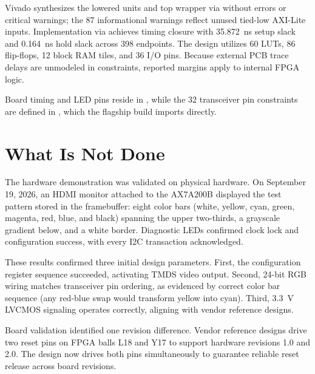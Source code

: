 \documentclass[journal,9pt]{IEEEtran}
\begin{document}


Vivado synthesizes the lowered units and top wrapper via
 without errors or critical warnings;
the 87 informational warnings reflect unused tied-low AXI-Lite inputs.
Implementation via  achieves timing
closure with 35.872~ns setup slack and 0.164~ns hold slack across 398
endpoints. The design utilizes 60 LUTs, 86 flip-flops, 12 block RAM tiles,
and 36 I/O pins. Because external PCB trace delays are unmodeled in
constraints, reported margins apply to internal FPGA logic.

Board timing and LED pins reside in ,
while the 32 transceiver pin constraints are defined in
, which the flagship build imports directly.





\section{What Is Not Done}
\label{sec:h-not}

The hardware demonstration was validated on physical hardware. On September
19, 2026, an HDMI monitor attached to the AX7A200B displayed the test
pattern stored in the framebuffer: eight color bars (white, yellow, cyan,
green, magenta, red, blue, and black) spanning the upper two-thirds, a
grayscale gradient below, and a white border. Diagnostic LEDs confirmed
clock lock and configuration success, with every I2C transaction
acknowledged.

These results confirmed three initial design parameters. First, the
configuration register sequence succeeded, activating TMDS video output.
Second, 24-bit RGB wiring matches transceiver pin ordering, as evidenced
by correct color bar sequence (any red-blue swap would transform yellow into
cyan). Third, 3.3~V LVCMOS signaling operates correctly, aligning with
vendor reference designs.

Board validation identified one revision difference. Vendor reference
designs drive two reset pins on FPGA balls L18 and Y17 to support hardware
revisions 1.0 and 2.0. The design now drives both pins simultaneously to
guarantee reliable reset release across board revisions.
\end{document}
